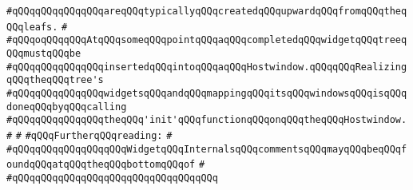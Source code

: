 \verb|#qQQqqQQqqQQqqQQqareqQQqtypicallyqQQqcreatedqQQqupwardqQQqfromqQQqtheqQQqleafs.|\newline
\verb|#|\newline
\verb|#qQQqoqQQqqQQqAtqQQqsomeqQQqpointqQQqaqQQqcompletedqQQqwidgetqQQqtreeqQQqmustqQQqbe|\newline
\verb|#qQQqqQQqqQQqqQQqinsertedqQQqintoqQQqaqQQqHostwindow.qQQqqQQqRealizingqQQqtheqQQqtree's|\newline
\verb|#qQQqqQQqqQQqqQQqwidgetsqQQqandqQQqmappingqQQqitsqQQqwindowsqQQqisqQQqdoneqQQqbyqQQqcalling|\newline
\verb|#qQQqqQQqqQQqqQQqtheqQQq'init'qQQqfunctionqQQqonqQQqtheqQQqHostwindow.|\newline
\verb|#|\newline
\verb|#|\newline
\verb|#qQQqFurtherqQQqreading:|\newline
\verb|#|\newline
\verb|#qQQqqQQqqQQqqQQqqQQqWidgetqQQqInternalsqQQqcommentsqQQqmayqQQqbeqQQqfoundqQQqatqQQqtheqQQqbottomqQQqof|\newline
\verb|#|\newline
\verb|#qQQqqQQqqQQqqQQqqQQqqQQqqQQqqQQqqQQq|\newline
\newline

